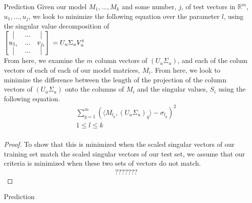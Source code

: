 \documentclass[11pt]{amsart}
\theoremstyle{definition}  %
\begin{document}
\begin{section}{Prediction}
	Given our model $M_1,...,M_k$ and some number, $j$, of test vectors in $\mathbb{R}^m$, $u_1,...,u_j$, we look to minimize the
	following equation over the parameter $l$, using the singular value decomposition of\\
		$\begin{bmatrix}
			\vline &...& \vline \\
			u_{1_i}&...& v_{j_i}\\
			\vline &...& \vline \\
		\end{bmatrix}\\ = U_u\Sigma_uV^t_u$\\
	From here, we examine the $m$ column vectors of $(U_u\Sigma_u)$, and each of the colum vectors of each of each of our
	model matrices, $M_i$. From here, we look to minimize the difference between the length of the projection of the column vectors
	of $(U_u\Sigma_u)$ onto the columns of $M_i$ and the singular values, $S_i$ using the following equation.
	\begin{align*}
		\sum_{q=1}^m (\langle M_{l_q},(U_u\Sigma_u)_{q}\rangle - \sigma_{l_q})^2\\
		1 \le l \le k \\
	\end{align*}
	\begin{proof}
		To show that this is minimized when the scaled singular vectors of our training set match the scaled singular vectors
		of our test set, we assume that our criteria is minimized when these two sets of vectors do not match.
		\begin{align*}
			???????
		\end{align*}
	\end{proof}
\end{section}{Prediction}
\end{document}
